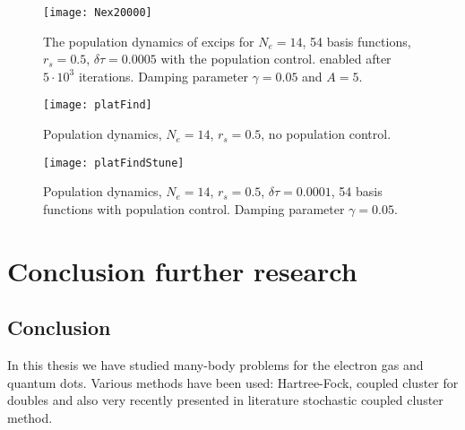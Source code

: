 \documentclass[twoside,english]{uiofysmaster}
\theoremstyle{definition}
\begin{document}
\begin{figure}[ht!]
	\centering
	\texttt{[image: Nex20000]}
	\caption{The population dynamics of excips for $N_e=14$, 54 basis functions, $r_s=0.5$, $\delta \tau=0.0005$ with the population control. enabled after $5\cdot 10^3$ iterations. Damping parameter  $\gamma = 0.05$ and $A=5$.}
	\label{fig:nx20k}
\end{figure}


\begin{landscape}
	\begin{figure}[ht!]
		\centering
		\texttt{[image: platFind]}
		\caption{Population dynamics, $N_e=14$, $r_s=0.5$, no population control.}
		\label{fig:platFind}
	\end{figure}
\end{landscape}

\begin{landscape}
	\begin{figure}[ht!]
		\centering
		\texttt{[image: platFindStune]}
		\caption{Population dynamics, $N_e=14$, $r_s=0.5$, $\delta \tau=0.0001$, 54 basis functions  with population control. Damping parameter $\gamma = 0.05$. }
		\label{fig:platFindStune}
	\end{figure}
	
\end{landscape}



\clearpage

\part{Conclusion further research}
\chapter{Conclusion}

In this thesis we have studied many-body problems for the electron gas and quantum dots. Various methods have been used:  Hartree-Fock,  coupled cluster for doubles and also very recently presented in literature stochastic coupled cluster method. 
\end{document}
